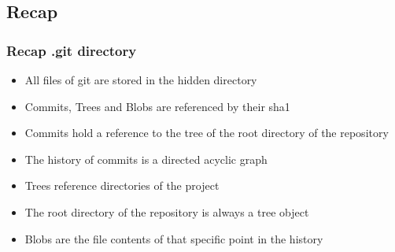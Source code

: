 \subsection{Recap}
\begin{frame}
    \frametitle{Recap .git directory}
    \begin{itemize}
        \item All files of git are stored in the hidden directory
        \item Commits, Trees and Blobs are referenced by their sha1\footnotemark
        \item Commits hold a reference to the tree of the root directory of the repository
        \item The history of commits is a directed acyclic graph\footnotemark
        \item Trees reference directories of the project
        \item The root directory of the repository is always a tree object
        \item Blobs are the file contents of that specific point in the history
    \end{itemize}
\end{frame}

